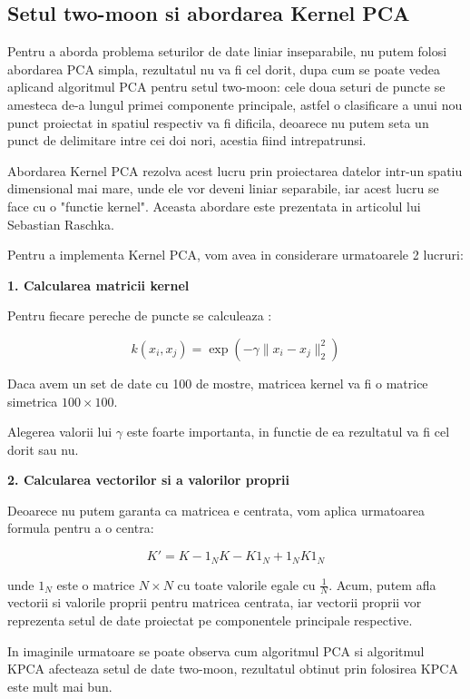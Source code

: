 \documentclass[12pt,oneside]{article}
\begin{document}
\subsection{Setul two-moon si abordarea Kernel PCA}
Pentru a aborda problema seturilor de date liniar inseparabile, nu putem folosi abordarea PCA simpla, rezultatul nu va fi cel dorit, dupa cum se poate vedea aplicand algoritmul PCA pentru setul two-moon: cele doua seturi de puncte se amesteca de-a lungul primei componente principale, astfel o clasificare a unui nou punct proiectat in spatiul respectiv va fi dificila, deoarece nu putem seta un punct de delimitare intre cei doi nori, acestia fiind intrepatrunsi. 

Abordarea Kernel PCA rezolva acest lucru prin proiectarea datelor intr-un spatiu dimensional mai mare, unde ele vor deveni liniar separabile, iar acest lucru se face cu o "functie kernel". Aceasta abordare este prezentata in articolul lui Sebastian Raschka.\cite{kernel_pca}

Pentru a implementa Kernel PCA, vom avea in considerare urmatoarele 2 lucruri:

\textbf{1. Calcularea matricii kernel} 

Pentru fiecare pereche de puncte se calculeaza :

\begin{equation}
k(x_i,x_j)=\exp(-\gamma \|x_i - x_j\|_2^2)
\end{equation}

Daca avem un set de date cu 100 de mostre, matricea kernel va fi o matrice simetrica $100 \times 100$.

Alegerea valorii lui $\gamma$ este foarte importanta, in functie de ea rezultatul va fi cel dorit sau nu.

\textbf{2. Calcularea vectorilor si a valorilor proprii}

Deoarece nu putem garanta ca matricea e centrata, vom aplica urmatoarea formula pentru a o centra: 

\begin{equation}
K'=K-1_NK-K1_N+1_NK1_N
\end{equation}

unde $1_N$ este o matrice $N \times N$ cu toate valorile egale cu $\frac{1}{N}$.
Acum, putem afla vectorii si valorile proprii pentru matricea centrata, iar vectorii proprii vor reprezenta setul de date proiectat pe componentele principale respective.

In imaginile urmatoare se poate observa cum algoritmul PCA si algoritmul KPCA afecteaza setul de date two-moon, rezultatul obtinut prin folosirea KPCA este mult mai bun. 
\end{document}
